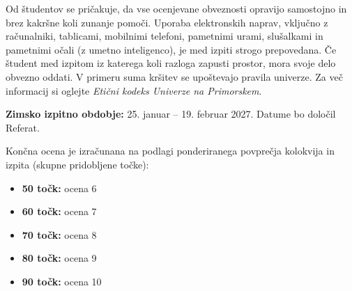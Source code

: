 \documentclass[11pt, a4paper]{article}
\begin{document}
Od študentov se pričakuje, da vse ocenjevane obveznosti opravijo samostojno in brez kakršne koli zunanje pomoči. Uporaba elektronskih naprav, vključno z računalniki, tablicami, mobilnimi telefoni, pametnimi urami, slušalkami in pametnimi očali (z umetno inteligenco), je med izpiti strogo prepovedana. Če študent med izpitom iz katerega koli razloga zapusti prostor, mora svoje delo obvezno oddati. V primeru suma kršitev se upoštevajo pravila univerze. Za več informacij si oglejte \textit{Etični kodeks Univerze na Primorskem}.

\textbf{Zimsko izpitno obdobje:} 25. januar – 19. februar 2027. Datume bo določil Referat.

Končna ocena je izračunana na podlagi ponderiranega povprečja kolokvija in izpita (skupne pridobljene točke):
\begin{itemize}[label={\color{primary}\textbullet}, itemsep=0pt]
    \item \textbf{50 točk:} ocena 6
    \item \textbf{60 točk:} ocena 7
    \item \textbf{70 točk:} ocena 8
    \item \textbf{80 točk:} ocena 9
    \item \textbf{90 točk:} ocena 10
\end{itemize}
\end{document}
